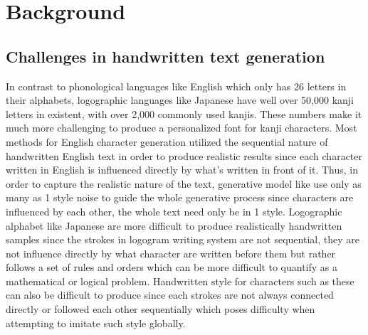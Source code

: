 \documentclass[12pt]{report}
\begin{document}
\newpage	
\chapter{Background}
\label{chap:background}

\section{Challenges in handwritten text generation}

In contrast to phonological languages like English which only has 26 letters in their alphabets, logographic languages like Japanese have well over 50,000 kanji letters in existent, with over 2,000 commonly used kanjis. These numbers make it much more challenging to produce a personalized font for kanji characters.
Most methods for English character generation utilized the sequential nature of handwritten English text in order to produce realistic results since each character written in English is influenced directly by what’s written in front of it. Thus, in order to capture the realistic nature of the text, generative model like \cite{scrabble-gan} use only as many as 1 style noise to guide the whole generative process since characters are influenced by each other, the whole text need only be in 1 style. Logographic alphabet like Japanese are more difficult to produce realistically handwritten samples since the strokes in logogram writing system are not sequential, they are not influence directly by what character are written before them but rather follows a set of rules and orders which can be more difficult to quantify as a mathematical or logical problem. Handwritten style for characters such as these can also be difficult to produce since each strokes are not always connected directly or followed each other sequentially which poses difficulty when attempting to imitate such style globally.
\end{document}
